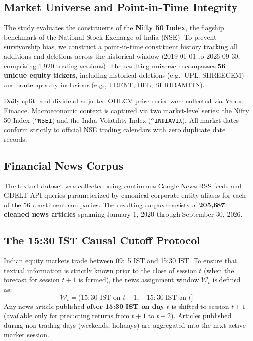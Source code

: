 \documentclass[10pt,journal,compsoc,twocolumn]{IEEEtran}
\begin{document}
\subsection{Market Universe and Point-in-Time Integrity}
The study evaluates the constituents of the \textbf{Nifty 50 Index}, the flagship benchmark of the National Stock Exchange of India (NSE). To prevent survivorship bias, we construct a point-in-time constituent history tracking all additions and deletions across the historical window (2019-01-01 to 2026-09-30, comprising 1,920 trading sessions). The resulting universe encompasses \textbf{56 unique equity tickers}, including historical deletions (e.g., UPL, SHREECEM) and contemporary inclusions (e.g., TRENT, BEL, SHRIRAMFIN).

Daily split- and dividend-adjusted OHLCV price series were collected via Yahoo Finance. Macroeconomic context is captured via two market-level series: the Nifty 50 Index (\verb|^NSEI|) and the India Volatility Index (\verb|^INDIAVIX|). All market dates conform strictly to official NSE trading calendars with zero duplicate date records.

\subsection{Financial News Corpus}
The textual dataset was collected using continuous Google News RSS feeds and GDELT API queries parameterized by canonical corporate entity aliases for each of the 56 constituent companies. The resulting corpus consists of \textbf{205,687 cleaned news articles} spanning January 1, 2020 through September 30, 2026.

\subsection{The 15:30 IST Causal Cutoff Protocol}
Indian equity markets trade between 09:15 IST and 15:30 IST. To ensure that textual information is strictly known prior to the close of session $t$ (when the forecast for session $t+1$ is formed), the news assignment window $\mathcal{W}_t$ is defined as:
\begin{equation}
\mathcal{W}_t = (15:30\text{ IST on } t-1, \quad 15:30\text{ IST on } t]
\end{equation}
Any news article published \textbf{after 15:30 IST on day $t$} is shifted to session $t+1$ (available only for predicting returns from $t+1$ to $t+2$). Articles published during non-trading days (weekends, holidays) are aggregated into the next active market session.
\end{document}

